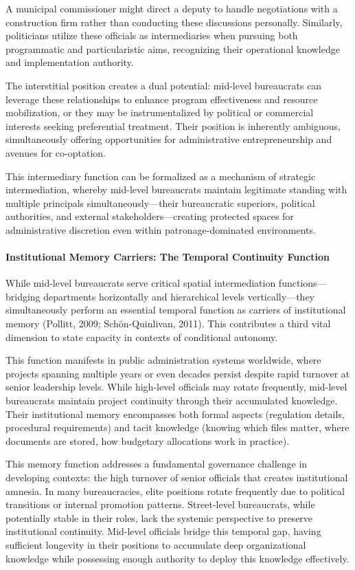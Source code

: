 A municipal commissioner might direct a deputy to handle negotiations with a construction firm rather than conducting these discussions personally. Similarly, politicians utilize these officials as intermediaries when pursuing both programmatic and particularistic aims, recognizing their operational knowledge and implementation authority.

The interstitial position creates a dual potential: mid-level bureaucrats can leverage these relationships to enhance program effectiveness and resource mobilization, or they may be instrumentalized by political or commercial interests seeking preferential treatment. Their position is inherently ambiguous, simultaneously offering opportunities for administrative entrepreneurship and avenues for co-optation.

This intermediary function can be formalized as a mechanism of strategic intermediation, whereby mid-level bureaucrats maintain legitimate standing with multiple principals simultaneously—their bureaucratic superiors, political authorities, and external stakeholders—creating protected spaces for administrative discretion even within patronage-dominated environments.

\paragraph{Institutional Memory Carriers: The Temporal Continuity Function}

While mid-level bureaucrats serve critical spatial intermediation functions—bridging departments horizontally and hierarchical levels vertically—they simultaneously perform an essential temporal function as carriers of institutional memory (Pollitt, 2009; Schön-Quinlivan, 2011). This contributes a third vital dimension to state capacity in contexts of conditional autonomy.

This function manifests in public administration systems worldwide, where projects spanning multiple years or even decades persist despite rapid turnover at senior leadership levels. While high-level officials may rotate frequently, mid-level bureaucrats maintain project continuity through their accumulated knowledge. Their institutional memory encompasses both formal aspects (regulation details, procedural requirements) and tacit knowledge (knowing which files matter, where documents are stored, how budgetary allocations work in practice).

This memory function addresses a fundamental governance challenge in developing contexts: the high turnover of senior officials that creates institutional amnesia. In many bureaucracies, elite positions rotate frequently due to political transitions or internal promotion patterns. Street-level bureaucrats, while potentially stable in their roles, lack the systemic perspective to preserve institutional continuity. Mid-level officials bridge this temporal gap, having sufficient longevity in their positions to accumulate deep organizational knowledge while possessing enough authority to deploy this knowledge effectively.


